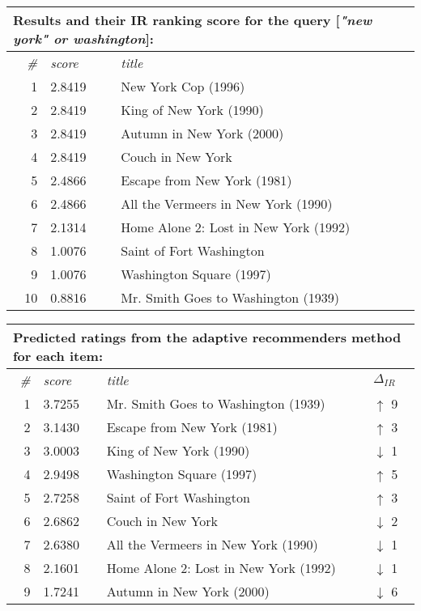 \begin{table}[h]
  \centering 

  \begin{tabular*}{0.9\textwidth}{ r l p{8cm} }
    \multicolumn{3}{l}{Results and their IR ranking score for the query [\emph{"new york" or washington}]:}\\
    \toprule
    \emph{\#} & \emph{score} & \emph{title}\\
    \midrule
    1 & 2.8419  &  New York Cop (1996)                    \\
    2 & 2.8419  &  King of New York (1990)                \\
    3 & 2.8419  &  Autumn in New York (2000)              \\
    4 & 2.8419  &  Couch in New York                      \\
    5 & 2.4866  &  Escape from New York (1981)            \\
    6 & 2.4866  &  All the Vermeers in New York (1990)    \\
    7 & 2.1314  &  Home Alone 2: Lost in New York (1992)  \\
    8 & 1.0076  &  Saint of Fort Washington               \\
    9 & 1.0076  &  Washington Square (1997)               \\
    10& 0.8816  &  Mr. Smith Goes to Washington (1939)    \\
    \bottomrule
  \end{tabular*}

  \vspace{1em} 

  \begin{tabular*}{0.9\textwidth}{ r l p{8.5cm} l }
    \multicolumn{4}{l}{Predicted ratings from the adaptive recommenders method for each item:}\\
    \toprule
    \emph{\#} & \emph{score} & \emph{title} & $\Delta_{IR}$\\
    \midrule
    1 & 3.7255  &  Mr. Smith Goes to Washington (1939)    & \color{green} $\uparrow$ 9 \\
    2 & 3.1430  &  Escape from New York (1981)            & \color{green} $\uparrow$ 3 \\
    3 & 3.0003  &  King of New York (1990)                & \color{red} $\downarrow$ 1 \\
    4 & 2.9498  &  Washington Square (1997)               & \color{green} $\uparrow$ 5 \\
    5 & 2.7258  &  Saint of Fort Washington               & \color{green} $\uparrow$ 3 \\
    6 & 2.6862  &  Couch in New York                      & \color{red} $\downarrow$ 2 \\
    7 & 2.6380  &  All the Vermeers in New York (1990)    & \color{red} $\downarrow$ 1 \\
    8 & 2.1601  &  Home Alone 2: Lost in New York (1992)  & \color{red} $\downarrow$ 1 \\
    9 & 1.7241  &  Autumn in New York (2000)              & \color{red} $\downarrow$ 6 \\
    \bottomrule
  \end{tabular*}


\end{table}

